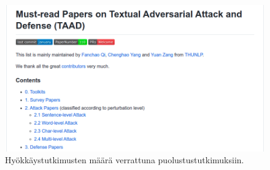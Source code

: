 \begin{figure}[ht]
  \includegraphics[scale=0.4]{figures/github-papers.png}
  \caption{Hyökkäystutkimusten määrä verrattuna puolustustutkimuksiin.}
\end{figure}